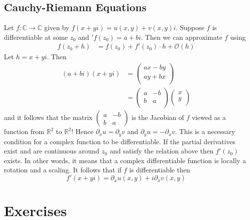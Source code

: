\documentclass{article}
\newcommand{\R}{\mathbb{R}}
\newcommand{\C}{\mathbb{C}}
\theoremstyle{remark}
\begin{document}
    \subsection{Cauchy-Riemann Equations}
    Let $f:\C\to\C$ given by $f(x+yi)=u(x,y)+v(x,y)i$. Suppose $f$ is differentiable at some $z_0$ and $'f(z_0)=a+bi$.
    Then we can approximate $f$ using
    \begin{align*}
        f(z_0+h)&=f(z_0)+f'(z_0)\cdot h+\mathcal{O}(h)
    \end{align*}
    Let $h=x+yi$. Then
    \begin{align*}
        (a+bi)(x+yi)&=\begin{pmatrix}
            ax-by\\
            ay+bx\\
        \end{pmatrix}\\
        &=\begin{pmatrix}
            a&-b\\
            b&a\\
        \end{pmatrix}
        \begin{pmatrix}
            x\\ y \\
        \end{pmatrix}
    \end{align*}
    and it follows that the matrix $\begin{pmatrix}a&-b\\b&a   \end{pmatrix}$ is the Jacobian of $f$ viewed as a function from $\R^2$ to $\R^2$!
    Hence $\partial_x u = \partial_y v$ and $\partial_y u = -\partial_x v$. This is a necessary condition for a complex function to be differentiable.
    If the partial derivatives exist and are continuous around $z_0$ and  satisfy the relation above then $f'(z_0)$ exists.
    In other words, it means that a complex differentiable function is locally a rotation and a scaling.
    It follows that if $f$ is differentiable then
    $$
        f'(x+yi)=\partial_x u(x,y)+i\partial_x v(x,y)
    $$

    \newpage
    \section{Exercises}
    
\end{document}
